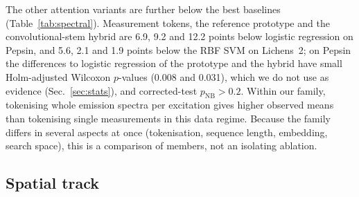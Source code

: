 \documentclass[journal]{IEEEtran}
\begin{document}
\begin{table}[!t]
\centering
\caption{Paired comparison of our attention variants and baselines, one block per dataset and track. First rows of each block: every attention variant against the strongest baseline (Holm across variants). Remaining rows: our best variant (marked $^*$, selected on the test units, hence optimistic) against every other baseline (Holm across baselines). $n$: units; $\bar d$: mean difference in balanced accuracy in points with bootstrap 95\% CI; W/T/L: wins, ties, losses; $p_{\mathrm{W}}$: Wilcoxon $p$ (unadjusted), $p_{\mathrm{NB}}$: Nadeau--Bengio corrected $t$-test $p$ (unadjusted), $p_{\mathrm{W}}^{\mathrm{Holm}}$: Holm-adjusted Wilcoxon $p$. With $n=4$ the smallest attainable two-sided Wilcoxon $p$ is 0.125.}
\label{tab:stats}
\scriptsize
\setlength{\tabcolsep}{3pt}

\end{table}

The other attention variants are further below the best baselines (Table~\ref{tab:spectral}). Measurement tokens, the reference prototype and the convolutional-stem hybrid are 6.9, 9.2 and 12.2 points below logistic regression on Pepsin, and 5.6, 2.1 and 1.9 points below the RBF SVM on Lichens~2; on Pepsin the differences to logistic regression of the prototype and the hybrid have small Holm-adjusted Wilcoxon $p$-values (0.008 and 0.031), which we do not use as evidence (Sec.~\ref{sec:stats}), and corrected-test $p_{\mathrm{NB}}>0.2$. Within our family, tokenising whole emission spectra per excitation gives higher observed means than tokenising single measurements in this data regime. Because the family differs in several aspects at once (tokenisation, sequence length, embedding, search space), this is a comparison of members, not an isolating ablation.

\subsection{Spatial track}
\begin{table}[!t]
\centering
\caption{Oracle-masked spatial track: balanced accuracy (\%), mean $\pm$ std over units (6, 4 and 4). Patch size $P$ is tuned in $\{5,7\}$. All spatial models use annotation-derived component boundaries when constructing patches. Best per column is bold and second best is underlined. The $\Delta$ row is descriptive and compares the highest-mean proposed spatial model with the highest-mean baseline.}
\label{tab:spatial}

\end{table}
\end{document}
